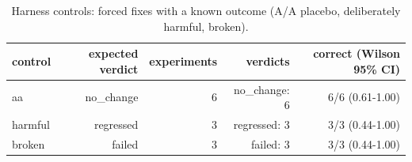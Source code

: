 \begin{table}[t]
\centering\small
\caption{Harness controls: forced fixes with a known outcome (A/A placebo, deliberately harmful, broken).}\label{tab:rq3_controls}
\begin{tabular}{lrrrr}
\toprule
control & expected verdict & experiments & verdicts & correct (Wilson 95\% CI) \\
\midrule
aa & no\_change & 6 & no\_change: 6 & 6/6 (0.61-1.00) \\
harmful & regressed & 3 & regressed: 3 & 3/3 (0.44-1.00) \\
broken & failed & 3 & failed: 3 & 3/3 (0.44-1.00) \\
\bottomrule
\end{tabular}
\end{table}
